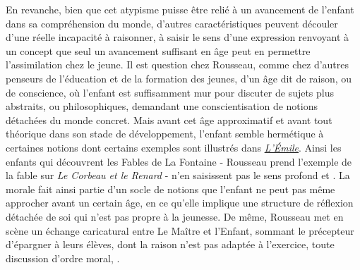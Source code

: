 \documentclass[a4paper,french,bookmarks]{article}
\begin{document}
\qquad En revanche, bien que cet atypisme puisse être relié à un avancement de l'enfant dans sa compréhension du monde, d'autres caractéristiques peuvent découler d'une réelle incapacité à raisonner, à saisir le sens d'une expression renvoyant à un concept que seul un avancement suffisant en âge peut en permettre l'assimilation chez le jeune. Il est question chez Rousseau, comme chez d'autres penseurs de l'éducation et de la formation des jeunes, d'un âge dit de raison, ou de conscience, où l'enfant est suffisamment mur pour discuter de sujets plus abstraits, ou philosophiques, demandant une conscientisation de notions détachées du monde concret. Mais avant cet âge approximatif et avant tout théorique dans son stade de développement, l'enfant semble hermétique à certaines notions dont certains exemples sont illustrés dans \underline{\itshape L'Émile}. Ainsi les enfants qui découvrent les Fables de La Fontaine - Rousseau prend l'exemple de la fable sur \textit{Le Corbeau et le Renard} - n'en saisissent pas le sens profond et . La morale fait ainsi partie d'un socle de notions que l'enfant ne peut pas même approcher avant un certain âge, en ce qu'elle implique une structure de réflexion détachée de soi qui n'est pas propre à la jeunesse. De même, Rousseau met en scène un échange caricatural entre Le Maître et l'Enfant, sommant le précepteur d'épargner à leurs élèves, dont la raison n'est pas adaptée à l'exercice, toute discussion d'ordre moral, . 
\end{document}
